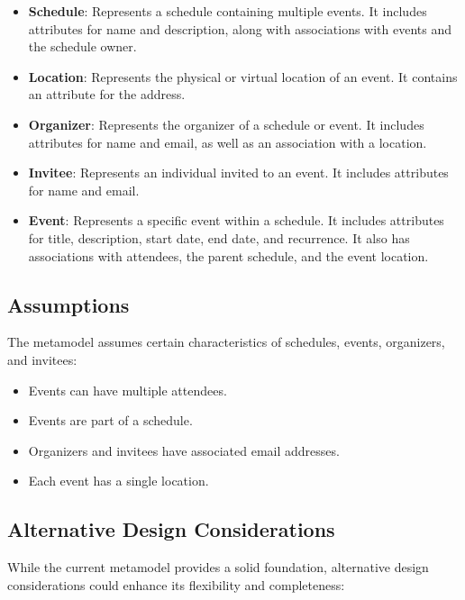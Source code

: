 \documentclass[12pt, letterpaper, twoside]{article}
\begin{document}
\begin{itemize}
    \item \textbf{Schedule}: Represents a schedule containing multiple events. It includes attributes for name and description, along with associations with events and the schedule owner.
    
    \item \textbf{Location}: Represents the physical or virtual location of an event. It contains an attribute for the address.
    
    \item \textbf{Organizer}: Represents the organizer of a schedule or event. It includes attributes for name and email, as well as an association with a location.
    
    \item \textbf{Invitee}: Represents an individual invited to an event. It includes attributes for name and email.
    
    \item \textbf{Event}: Represents a specific event within a schedule. It includes attributes for title, description, start date, end date, and recurrence. It also has associations with attendees, the parent schedule, and the event location.
\end{itemize}

\subsection{Assumptions}

The metamodel assumes certain characteristics of schedules, events, organizers, and invitees:

\begin{itemize}
    \item Events can have multiple attendees.
    \item Events are part of a schedule.
    \item Organizers and invitees have associated email addresses.
    \item Each event has a single location.
\end{itemize}

\subsection{Alternative Design Considerations}

While the current metamodel provides a solid foundation, alternative design considerations could enhance its flexibility and completeness:
\end{document}
